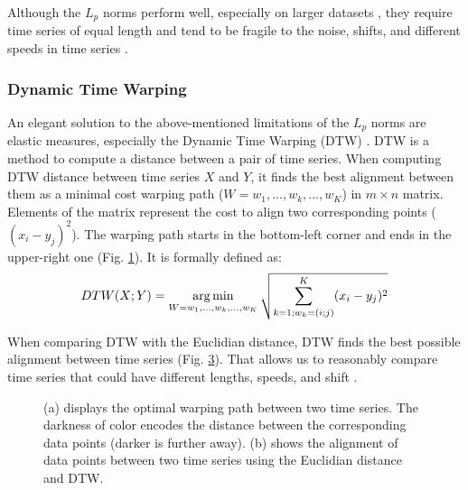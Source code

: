 Although the $L_p$ norms perform well, especially on larger datasets \cite{met:universal, met:comparison-new, met:met-comparison}, they require time series of equal length and tend to be fragile to the noise, shifts, and different speeds in time series \cite{met:classification}.

\subsubsection{Dynamic Time Warping}
An elegant solution to the above-mentioned limitations of the $L_p$ norms are elastic measures, especially the Dynamic Time Warping (DTW) \cite{met:dtw}. DTW is a method to compute a distance between a pair of time series. When computing DTW distance between time series $X$ and $Y$, it finds the best alignment between them as a minimal cost warping path ($W=w_1 ,...,w_k ,...,w_K$) in $m \times n$ matrix. Elements of the matrix represent the cost to align two corresponding points ($(x_i - y_j)^2$). The warping path starts in the bottom-left corner and ends in the upper-right one (Fig. \ref{fig:dtw_warping}). It is formally defined as:
\begin{equation}
    DTW(X; Y) = \operatorname*{arg\,min}_{W=w_1 ,...,w_k ,...,w_K} \sqrt{ \sum^{K}_{k=1; w_k=(i; j)} (x_i - y_j)^2}
\end{equation}

When comparing DTW with the Euclidian distance, DTW finds the best possible alignment between time series (Fig. \ref{fig:Euclid_vs_DTW}). That allows us to reasonably compare time series that could have different lengths, speeds, and shift \cite{met:dtw, met:dtw-window}.
\begin{figure}[h]
     \centering
     \begin{subfigure}[b]{0.495\textwidth}
        \centering
        
        \caption{}
        \label{fig:dtw_warping}
     \end{subfigure}
     \hfill
     \begin{subfigure}[b]{0.495\textwidth}
        \centering
        
        \caption{}
        \label{fig:Euclid_vs_DTW}
     \end{subfigure}
    \caption{
        (a) displays the optimal warping path between two time series. The darkness of color encodes the distance between the corresponding data points (darker is further away). (b) shows the alignment of data points between two time series using the Euclidian distance and DTW.
    }
\end{figure}

